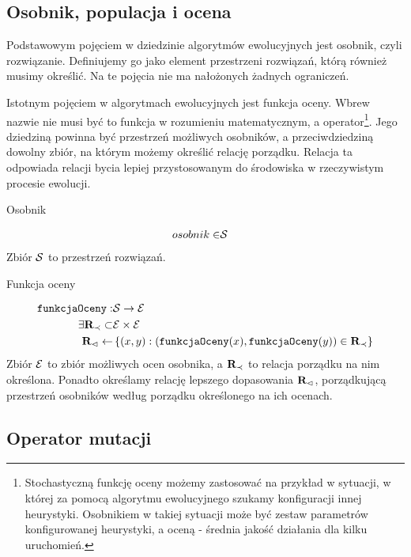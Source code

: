 \documentclass[./FM_mgr.tex]{subfiles}
\begin{document}
\subsection{Osobnik, populacja i ocena} \label{subsection:specimen_and_foo}

Podstawowym pojęciem w dziedzinie algorytmów ewolucyjnych jest osobnik, czyli rozwiązanie. 
Definiujemy go jako element przestrzeni rozwiązań, którą również musimy określić. 
Na te pojęcia nie ma nałożonych żadnych ograniczeń.

Istotnym pojęciem w algorytmach ewolucyjnych jest funkcja oceny. 
Wbrew nazwie nie musi być to funkcja w rozumieniu matematycznym, a operator\footnote{
	Stochastyczną funkcję oceny możemy zastosować na przykład w sytuacji, w której za pomocą algorytmu ewolucyjnego szukamy konfiguracji innej heurystyki. 
	Osobnikiem w takiej sytuacji może być zestaw parametrów konfigurowanej heurystyki, a oceną - średnia jakość działania dla kilku uruchomień.
}. 
Jego dziedziną powinna być przestrzeń możliwych osobników, a przeciwdziedziną dowolny zbiór, na którym możemy określić relację porządku. 
Relacja ta odpowiada relacji bycia lepiej przystosowanym do środowiska w rzeczywistym procesie ewolucji.


\begin{signature}
	\caption{Osobnik \label{signature:specimen}}
	\begin{align}
		osobnik \in &\mathcal{S}
	\end{align}
	Zbiór $\mathcal{S}$ to przestrzeń rozwiązań.
\end{signature}

\begin{signature}
	\caption{Funkcja oceny \label{signature:eval}}
	\begin{align}
		\mathtt{funkcjaOceny}: &\mathcal{S} \rightarrow \mathcal{E} \\
		\exists {\mathbf{R}}_{\prec} \subset &\mathcal{E} \times \mathcal{E} \\
		{\mathbf{R}}_{\lhd} \gets &\left\{ (x, y): (\mathtt{funkcjaOceny}(x), \mathtt{funkcjaOceny}(y)) \in {\mathbf{R}}_{\prec} \right\}
	\end{align}
	Zbiór $\mathcal{E}$ to zbiór możliwych ocen osobnika, 
	a ${\mathbf{R}}_{\prec}$ to relacja porządku na nim określona. Ponadto określamy relację lepszego dopasowania ${\mathbf{R}}_{\lhd}$, porządkującą przestrzeń osobników według porządku określonego na ich ocenach. 
\end{signature}

\subsection{Operator mutacji}
\end{document}
